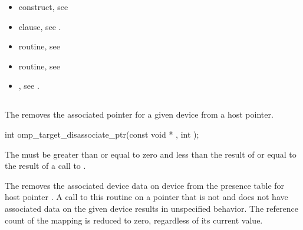 \begin{ccppspecific}
\crossreferences
\begin{itemize}
\item {} construct, see 

\item {} clause, see .

\item {} routine, see 

\item {} routine, see 

\item {}, see 
.

\end{itemize}

\subsection{}
\label{subsec:omp_target_disassociate_ptr}
\summary

The  removes the associated pointer for a
given device from a host pointer.

\begin{figure}[t!]
\end{figure}

\format
\begin{boxedcode}
int omp\_target\_disassociate\_ptr(const void * , int );
\end{boxedcode}

\constraints


The 
must be greater than or equal to zero and less than the result of
 or equal to the result of a call to
.

\effect

The  removes the associated device data
on device  from the presence table for host pointer
. A call to this routine on a pointer that is not 
 and does not have associated data on the given device results
in unspecified behavior.  The reference count of the mapping is reduced to 
zero, regardless of its current value.


\end{ccppspecific}
